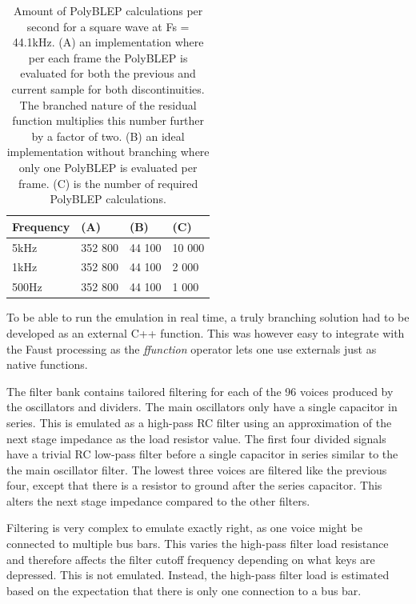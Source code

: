 \documentclass[11pt,a4paper]{article}
\begin{document}
\begin{table}[h]
 \begin{center}
\begin{tabular}{|l|l|l|l|}

      \hline
      Frequency & (A)        &  (B)         & (C) \\
      \hline\hline
      5kHz     & 352 800     & 44 100       & 10 000\\
      1kHz     & 352 800     & 44 100       &  2 000\\
      500Hz    & 352 800     & 44 100       &  1 000\\
      \hline

\end{tabular}
\caption{Amount of PolyBLEP calculations per second for a square wave at Fs = 44.1kHz. 
(A) an implementation where per each frame the PolyBLEP is evaluated for both the previous and current sample for both discontinuities. The branched nature of the residual function multiplies this number further by a factor of two.
(B) an ideal implementation without branching where only one PolyBLEP is evaluated per frame.
(C) is the number of required PolyBLEP calculations.  }\label{table:polyblep-amount}
 \end{center}
\end{table}

To be able to run the emulation in real time, a truly branching solution had to be developed as an external C++ function. This was however easy to integrate with the Faust processing as the \emph{ffunction} operator lets one use externals just as native functions.

The filter bank contains tailored filtering for each of the 96 voices produced by the oscillators and dividers. The main oscillators only have a single capacitor in series. This is emulated as a high-pass RC filter using an approximation of the next stage impedance as the load resistor value. The first four divided signals have a trivial RC low-pass filter before a single capacitor in series similar to the the main oscillator filter. The lowest three voices are filtered like the previous four, except that there is a resistor to ground after the series capacitor. This alters the next stage impedance compared to the other filters.

Filtering is very complex to emulate exactly right, as one voice might be connected to multiple bus bars. This varies the high-pass filter load resistance and therefore affects the filter cutoff frequency depending on what keys are depressed. This is not emulated. Instead, the high-pass filter load is estimated based on the expectation that there is only one connection to a bus bar.
\end{document}

